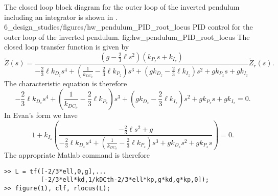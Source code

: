 
The closed loop block diagram for the outer loop of the inverted pendulum including an integrator is shown in .  
	{6_design_studies/figures/hw_pendulum_PID_root_locus}
	{PID control for the outer loop of the inverted pendulum.}
	{fig:hw_pendulum_PID_root_locus}
The closed loop transfer function is given by
\[
\tilde{Z}(s) = \frac{(g-\frac{2}{3}\ell s^2 )\left(k_{P_z}s+k_{I_z}\right)}{-\frac{2}{3}\ell k_{D_z} s^4 + \left(\frac{1}{k_{DC_\theta}}-\frac{2}{3} \ell  k_{P_z}\right)s^3 + (g k_{D_z}-\frac{2}{3}\ell  k_{I_z})s^2 + gk_{P_z}s +  g k_{I_z}} \tilde{Z}_r(s).
\]
The characteristic equation is therefore
\[
-\frac{2}{3}\ell k_{D_z} s^4 + \left(\frac{1}{k_{DC_\theta}}-\frac{2}{3} \ell  k_{P_z}\right)s^3 + (g k_{D_z}-\frac{2}{3}\ell  k_{I_z})s^2 + gk_{P_z}s +  g k_{I_z} = 0.
\]
In Evan's form we have
\[
1 + k_{I_z}\left(\frac{-\frac{2}{3}\ell s^2+g}{-\frac{2}{3}\ell k_{D_z} s^4 + \left(\frac{1}{k_{DC_\theta}}-\frac{2}{3} \ell  k_{P_z}\right)s^3 + g k_{D_z}s^2 + gk_{P_z}s}\right) = 0.
\]
The appropriate Matlab command is therefore
\begin{lstlisting}
>> L = tf([-2/3*ell,0,g],...
          [-2/3*ell*kd,1/kDCth-2/3*ell*kp,g*kd,g*kp,0]);
>> figure(1), clf, rlocus(L);
\end{lstlisting}


